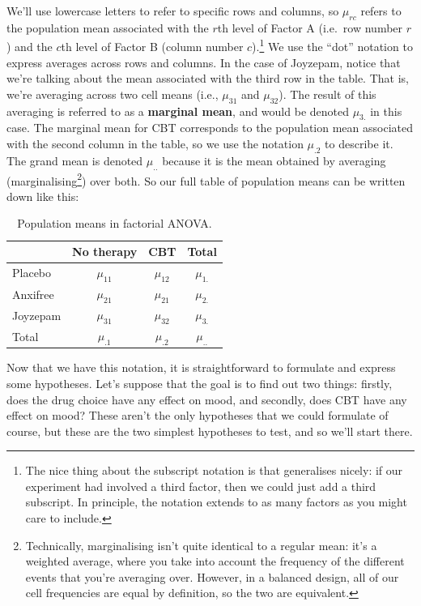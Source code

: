 \documentclass[
]{book}
\theoremstyle{definition}
\theoremstyle{definition}
\theoremstyle{definition}
\theoremstyle{definition}
\theoremstyle{remark}
\begin{document}
We'll use lowercase letters to refer to specific rows and columns, so \(\mu_{rc}\) refers to the population mean associated with the \(r\)th level of Factor A (i.e.~row number \(r\)) and the \(c\)th level of Factor B (column number \(c\)).\footnote{The nice thing about the subscript notation is that generalises nicely: if our experiment had involved a third factor, then we could just add a third subscript. In principle, the notation extends to as many factors as you might care to include.} We use the ``dot'' notation to express averages across rows and columns. In the case of Joyzepam, notice that we're talking about the mean associated with the third row in the table. That is, we're averaging across two cell means (i.e., \(\mu_{31}\) and \(\mu_{32}\)). The result of this averaging is referred to as a \textbf{marginal mean}, and would be denoted \(\mu_{3.}\) in this case. The marginal mean for CBT corresponds to the population mean associated with the second column in the table, so we use the notation \(\mu_{.2}\) to describe it. The grand mean is denoted \(\mu_{..}\) because it is the mean obtained by averaging (marginalising\footnote{Technically, marginalising isn't quite identical to a regular mean: it's a weighted average, where you take into account the frequency of the different events that you're averaging over. However, in a balanced design, all of our cell frequencies are equal by definition, so the two are equivalent.}) over both. So our full table of population means can be written down like this:

\begin{table}[!h]

\caption{\label{tab:unnamed-chunk-76}Population means in factorial ANOVA.}
\centering
\begin{tabular}[t]{lccc}
\toprule
 & No therapy & CBT & Total\\
\midrule
Placebo & $\mu_{11}$ & $\mu_{12}$ & $\mu_{1.}$\\
Anxifree & $\mu_{21}$ & $\mu_{21}$ & $\mu_{2.}$\\
Joyzepam & $\mu_{31}$ & $\mu_{32}$ & $\mu_{3.}$\\
Total & $\mu_{.1}$ & $\mu_{.2}$ & $\mu_{..}$\\
\bottomrule
\end{tabular}
\end{table}

Now that we have this notation, it is straightforward to formulate and express some hypotheses. Let's suppose that the goal is to find out two things: firstly, does the drug choice have any effect on mood, and secondly, does CBT have any effect on mood? These aren't the only hypotheses that we could formulate of course, but these are the two simplest hypotheses to test, and so we'll start there.
\end{document}
